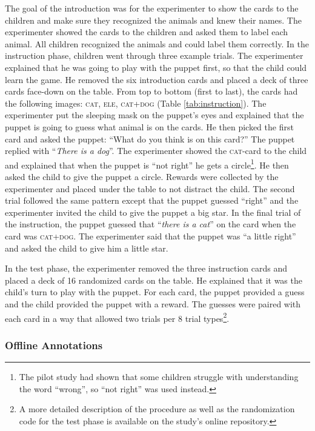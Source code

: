 \documentclass[,man,floatsintext]{apa6}
\let\rmarkdownfootnote\footnote%
\def\footnote{\protect\rmarkdownfootnote}
\begin{document}
The goal of the introduction was for the experimenter to show the cards to the children and make sure they recognized the animals and knew their names. The experimenter showed the cards to the children and asked them to label each animal. All children recognized the animals and could label them correctly. In the instruction phase, children went through three example trials. The experimenter explained that he was going to play with the puppet first, so that the child could learn the game. He removed the six introduction cards and placed a deck of three cards face-down on the table. From top to bottom (first to last), the cards had the following images: \textsc{cat}, \textsc{ele}, \textsc{cat+dog} (Table \ref{tab:instruction}). The experimenter put the sleeping mask on the puppet's eyes and explained that the puppet is going to guess what animal is on the cards. He then picked the first card and asked the puppet: \enquote{What do you think is on this card?} The puppet replied with \enquote{\emph{There is a dog}}. The experimenter showed the \textsc{cat}-card to the child and explained that when the puppet is \enquote{not right} he gets a circle\footnote{The pilot study had shown that some children struggle with understanding the word \enquote{wrong}, so \enquote{not right} was used instead.}. He then asked the child to give the puppet a circle. Rewards were collected by the experimenter and placed under the table to not distract the child. The second trial followed the same pattern except that the puppet guessed \enquote{right} and the experimenter invited the child to give the puppet a big star. In the final trial of the instruction, the puppet guessed that \enquote{\emph{there is a cat}} on the card when the card was \textsc{cat+dog}. The experimenter said that the puppet was \enquote{a little right} and asked the child to give him a little star.

In the test phase, the experimenter removed the three instruction cards and placed a deck of 16 randomized cards on the table. He explained that it was the child's turn to play with the puppet. For each card, the puppet provided a guess and the child provided the puppet with a reward. The guesses were paired with each card in a way that allowed two trials per 8 trial types\footnote{A more detailed description of the procedure as well as the randomization code for the test phase is available on the study's online repository.}.

\hypertarget{feedbackCoding}{%
\subsubsection{Offline Annotations}\label{feedbackCoding}}
\end{document}
